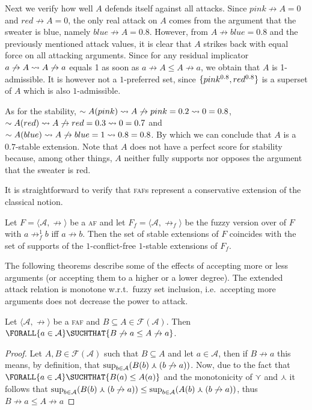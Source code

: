 \documentclass[12pt,a4paper]{article}
\newcommand{\Forall}[2]{\ensuremath{\FORALL{#1} \SUCHTHAT {#2}}}
\newcommand{\mc}[1]{\ensuremath{\mathcal{#1}}}
\newcommand{\abfaf}{\textsc{faf}}
\newcommand{\attack}{\ensuremath{\not\rightarrow}}
\newcommand{\af}[2]{\ensuremath{\langle{#1},{#2}\rangle}}
\newcommand{\abaf}{\textsc{af}}
\newcommand{\Fuzzy}[1]{\ensuremath{\mc{F}({#1})}}
\newcommand{\fand}{\ensuremath{\curlywedge}}
\newcommand{\for}{\ensuremath{\curlyvee}}
\newcommand{\fneg}{\ensuremath{\sim}}
\begin{document}
\begin{example}
Next we verify how well $A$ defends itself against all attacks. Since $pink \attack A = 0$ and $red \attack A = 0$, the only real attack on $A$ comes from the argument that the sweater is blue, namely $blue \attack A = 0.8$. However, from $A \attack blue = 0.8$ and the previously mentioned attack values, it is clear that $A$ strikes back with equal force on all attacking arguments. Since for any residual implicator $a \attack A \fimp A \attack a$ equals 1 as soon as $a \attack A \leq A \attack a$, we obtain that $A$ is 1-admissible. 
% 
It is however not a $1$-preferred set, since ${\{ pink^{0.8},red^{0.8} \}}$ is a superset of $A$ which is also $1$-admissible.

As for the stability, $\fneg A(pink) \fimp A \attack pink = 0.2 \fimp 0 = 0.8$, $\fneg A(red) \fimp A \attack red = 0.3 \fimp 0 = 0.7$ and $\fneg A(blue) \fimp A \attack blue = 1 \fimp 0.8 = 0.8$.  By which we can conclude that $A$ is a $0.7$-stable extension. Note that $A$ does not have a perfect score for stability because, among other things, $A$ neither fully supports nor opposes the argument that the sweater is red.
\end{example}

It is straightforward to verify that \abfaf{}s represent a conservative extension
of the classical notion.

\begin{theorem}\label{faf-extends-af}
Let $F = \af{\mc{A}}{\attack{}}$ be a \abaf{} and let
$F_f = \af{\mc{A}}{\attack_f}$ be the fuzzy version over 
of $F$ with $a \attack_f^1 b$ iff $a\attack b$.
Then the set of stable extensions of $F$ coincides with the set of
supports of the $1$-conflict-free $1$-stable extensions of
$F_f$.
\end{theorem}

The following theorems describe some
of the effects of accepting more or less arguments (or accepting them
to a higher or a lower degree).  
The extended attack relation is
monotone w.r.t.~fuzzy set inclusion, i.e.~accepting more arguments
does not decrease the power to attack.

\begin{theorem}\label{MonotonStable1}
Let \af{\mc{A}}{\attack} be a \abfaf{} and $B\subseteq A \in \Fuzzy{\mc{A}}$.
Then $\Forall{a\in\mc{A}}{B \attack a \leq A \attack a}$.
\end{theorem}
\begin{proof}
 Let $A,B \in \mc{F}(\mc{A})$ such that $B \subseteq A$ and let $a \in \mc{A}$, 
 then if $B \attack a$ this means, by definition, that 
 $\suprof{b \in \mc{A}}{B(b) \fand (b \attack a)}$.  
 Now, due to the fact that $\Forall{a \in \mc{A}}{B(a) \leq A(a)}$ 
 and the monotonicity of $\for$ and $\fand$ it follows that 
 $\suprof{b \in \mc{A}}{B(b) \fand (b \attack a)} \leq 
 \suprof{b \in \mc{A}}{A(b) \fand (b \attack a)}$, 
 thus $B \attack a \leq A \attack a$
\end{proof}
\end{document}
